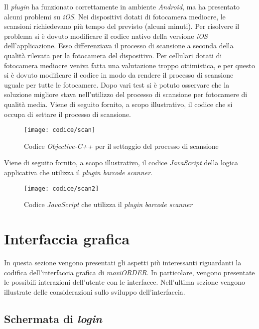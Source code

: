 Il \textit{plugin} ha funzionato correttamente in ambiente \textit{Android}, ma ha presentato alcuni problemi su \textit{iOS}. Nei dispositivi dotati di fotocamera mediocre, le scansioni richiedevano più tempo del previsto (alcuni minuti). Per risolvere il problema si è dovuto modificare il codice nativo della versione \textit{iOS} dell'applicazione. Esso differenziava il processo di scansione a seconda della qualità rilevata per la fotocamera del dispositivo. Per cellulari dotati di fotocamera mediocre veniva fatta una valutazione troppo ottimistica, e per questo si è dovuto modificare il codice in modo da rendere il processo di scansione uguale per tutte le fotocamere. Dopo vari test si è potuto osservare che la soluzione migliore stava nell'utilizzo del processo di scansione per fotocamere di qualità media. Viene di seguito fornito, a scopo illustrativo, il codice  che si occupa di settare il processo di scansione.

\begin{figure}[!h] 
    \centering 
    \texttt{[image: codice/scan]} 
    \caption{Codice \textit{Objective-C++} per il settaggio del processo di scansione}
\end{figure}

\newpage

Viene di seguito fornito, a scopo illustrativo, il codice \textit{JavaScript} della logica applicativa che utilizza il \textit{plugin} \textit{barcode scanner}.

\begin{figure}[!h] 
    \centering 
    \texttt{[image: codice/scan2]} 
    \caption{Codice \textit{JavaScript} che utilizza il \textit{plugin} \textit{barcode scanner}}
\end{figure}

\newpage

\section{Interfaccia grafica}

In questa sezione vengono presentati gli aspetti più interessanti riguardanti la codifica dell'interfaccia grafica di \textit{moviORDER}. In particolare, vengono presentate le possibili interazioni dell'utente con le interfacce. Nell'ultima sezione vengono illustrate delle considerazioni sullo sviluppo dell'interfaccia.

\subsection{Schermata di \textit{login}}

